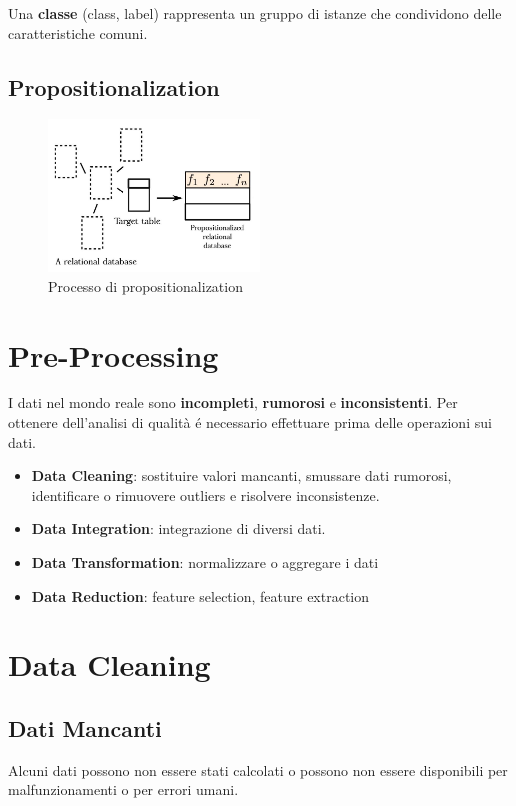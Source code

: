 Una \textbf{classe} (class, label) rappresenta un gruppo di istanze che condividono delle caratteristiche comuni.

\subsection*{Propositionalization}

\begin{figure}[ht]
  \centering
  \includegraphics[width=0.5\textwidth]{images/Propositionalization.jpeg}
  \caption{Processo di propositionalization \cite{lavravc2020propositionalization}}
\end{figure}

\pagebreak

\section{Pre-Processing}
I dati nel mondo reale sono \textbf{incompleti}, \textbf{rumorosi} e \textbf{inconsistenti}.
Per ottenere dell'analisi di qualità é necessario effettuare prima delle 
operazioni sui dati.

\begin{itemize}
  \item \textbf{Data Cleaning}: sostituire valori mancanti, smussare dati rumorosi, identificare o rimuovere outliers e risolvere inconsistenze.
  \item \textbf{Data Integration}: integrazione di diversi dati.
  \item \textbf{Data Transformation}: normalizzare o aggregare i dati
  \item \textbf{Data Reduction}: feature selection, feature extraction
\end{itemize}

\section{Data Cleaning}

\subsection*{Dati Mancanti}
Alcuni dati possono non essere stati calcolati o possono non essere disponibili per malfunzionamenti o per errori umani.

